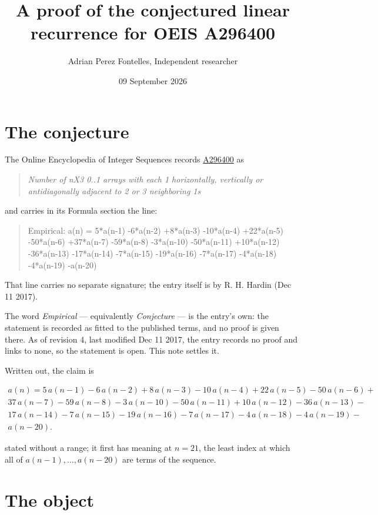 \documentclass[11pt]{article}
\title{A proof of the conjectured linear recurrence for OEIS A296400}
\author{Adrian Perez Fontelles, Independent researcher}
\date{09 September 2026}
\theoremstyle{definition}
\begin{document}
\maketitle
\section{The conjecture}

The Online Encyclopedia of Integer Sequences records \href{https://oeis.org/A296400}{A296400} as

\begin{quote}\itshape Number of nX3 0..1 arrays with each 1 horizontally, vertically or antidiagonally adjacent to 2 or 3 neighboring 1s\end{quote}

and carries in its Formula section the line:

\begin{quote}\ttfamily Empirical: a(n) = 5*a(n-1) -6*a(n-2) +8*a(n-3) -10*a(n-4) +22*a(n-5) -50*a(n-6) +37*a(n-7) -59*a(n-8) -3*a(n-10) -50*a(n-11) +10*a(n-12) -36*a(n-13) -17*a(n-14) -7*a(n-15) -19*a(n-16) -7*a(n-17) -4*a(n-18) -4*a(n-19) -a(n-20)\end{quote}

That line carries no separate signature; the entry itself is by R. H. Hardin (Dec 11 2017).

The word {\itshape Empirical} --- equivalently {\itshape Conjecture} --- is the entry's own: the statement is recorded as fitted to the published terms, and no proof is given there. As of revision 4, last modified Dec 11 2017, the entry records no proof and links to none, so the statement is open. This note settles it.

Written out, the claim is

\begin{multline*} a(n) = 5\,a(n-1) - 6\,a(n-2) + 8\,a(n-3) - 10\,a(n-4) + 22\,a(n-5) - 50\,a(n-6) + \\ 37\,a(n-7) - 59\,a(n-8) - 3\,a(n-10) - 50\,a(n-11) + 10\,a(n-12) - 36\,a(n-13) - \\ 17\,a(n-14) - 7\,a(n-15) - 19\,a(n-16) - 7\,a(n-17) - 4\,a(n-18) - 4\,a(n-19) - \\ a(n-20). \end{multline*}

stated without a range; it first has meaning at $n = 21$, the least index at which all of $a(n-1),\dots,a(n-20)$ are terms of the sequence.

\section{The object}
\end{document}
